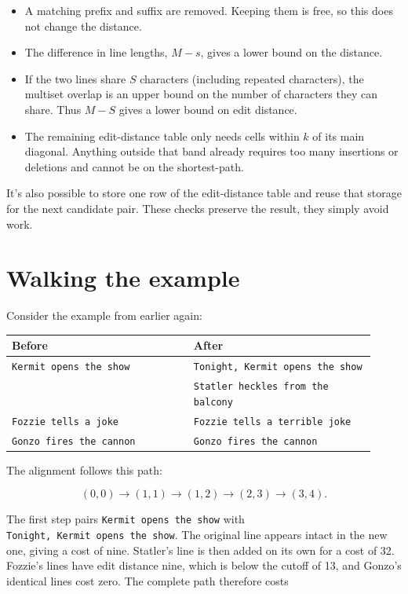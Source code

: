 \documentclass[
]{article}
\providecommand{\tightlist}{%
  \setlength{\itemsep}{0pt}\setlength{\parskip}{0pt}}
\begin{document}
\begin{itemize}
\tightlist
\item
  A matching prefix and suffix are removed. Keeping them is free, so
  this does not change the distance.
\item
  The difference in line lengths, \(M-s\), gives a lower bound on the
  distance.
\item
  If the two lines share \(S\) characters (including repeated
  characters), the multiset overlap is an upper bound on the number of
  characters they can share. Thus \(M-S\) gives a lower bound on edit
  distance.
\item
  The remaining edit-distance table only needs cells within \(k\) of its
  main diagonal. Anything outside that band already requires too many
  insertions or deletions and cannot be on the shortest-path.
\end{itemize}

It's also possible to store one row of the edit-distance table and reuse
that storage for the next candidate pair. These checks preserve the
result, they simply avoid work.

\hypertarget{walking-the-example}{%
\section{Walking the example}\label{walking-the-example}}

Consider the example from earlier again:

\begin{longtable}[]{@{}p{0.46\linewidth}p{0.46\linewidth}@{}}
\toprule
Before & After\tabularnewline
\midrule
\endhead
\texttt{Kermit opens the show} &
\texttt{Tonight, Kermit opens the show}\tabularnewline
& \texttt{Statler heckles from the balcony}\tabularnewline
\texttt{Fozzie tells a joke} &
\texttt{Fozzie tells a terrible joke}\tabularnewline
\texttt{Gonzo fires the cannon} &
\texttt{Gonzo fires the cannon}\tabularnewline
\bottomrule
\end{longtable}

The alignment follows this path:

\[(0,0)\rightarrow(1,1)\rightarrow(1,2)\rightarrow(2,3)
\rightarrow(3,4).\]

The first step pairs \texttt{Kermit\ opens\ the\ show} with
\texttt{Tonight,\ Kermit\ opens\ the\ show}. The original line appears
intact in the new one, giving a cost of nine. Statler's line is then
added on its own for a cost of 32. Fozzie's lines have edit distance
nine, which is below the cutoff of 13, and Gonzo's identical lines cost
zero. The complete path therefore costs
\end{document}
